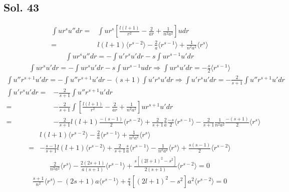 \subsection*{Sol. 43}
\begin{align*}
    \int ur^s u''dr = &
    \int ur^s\left[\frac{l(l+1)}{r^2}-\frac{2}{ar}+\frac{1}{n^2a^2}\right]udr\\
    =&l(l+1)\langle r^{s-2}\rangle-
    \frac{2}{a}\langle r^{s-1}\rangle
    +\frac{1}{n^2a^2}\langle r^s\rangle
\end{align*}
\begin{align*}
    \int ur^s u''dr = -\int u'r^su' dr -s\int ur^{s-1}u'dr
\end{align*}
\begin{align*}
    \int ur^s u'dr = -\int u r^s u' dr -s \int u r^{s-1}u dr\Rightarrow \int u r^su'dr = -\frac{s}{2}\langle r^{s-1}\rangle
\end{align*}
\begin{align*}
    \int u''r^{s+1}u' dr = -\int u''r^{s+1}u'dr - (s+1)\int u'r^su'dr\Rightarrow 
    \int u'r^su'dr = -\frac{2}{s+1}\int u''r^{s+1}u'dr
\end{align*}
\begin{align*}
    \int u'r^su'dr =& -\frac{2}{s+1}\int u''r^{s+1}u'dr\\
    =& -\frac{2}{s+1}\int
    \left[\frac{l(l+1)}{r^2}-\frac{2}{ar}+\frac{1}{n^2a^2}\right]u
    r^{s+1} u' dr\\
    =&-\frac{2}{s+1}l(l+1)\frac{-(s-1)}{2}\langle r^{s-2}\rangle
    +\frac{2}{s+1}\frac{2}{a}\frac{-s}{2}\langle r^{s-1}\rangle
    -\frac{2}{s+1}\frac{1}{n^2a^2}\frac{-(s+1)}{2}\langle r^s\rangle
\end{align*}
\begin{align*}
    &l(l+1)\langle r^{s-2}\rangle-
    \frac{2}{a}\langle r^{s-1}\rangle
    +\frac{1}{n^2a^2}\langle r^s\rangle \\
    =& 
    -\frac{s-1}{s+1}l(l+1)\langle r^{s-2}\rangle
    +\frac{2}{s+1}\frac{s}{a}\langle r^{s-1}\rangle
    -\frac{1}{n^2a^2}\langle r^s\rangle
    +\frac{s(s-1)}{2}\langle r^{s-2}\rangle
\end{align*}
\begin{align*}
    \frac{2}{n^2a^2}\langle r^s\rangle - \frac{2(2s+1)}{a(s+1)}\langle r^{s-1}\rangle 
    +\frac{s[(2l+1)^2-s^2]}{2(s+1)}\langle r^{s-2}\rangle = 0
\end{align*}
\begin{align*}
    \frac{s+1}{n^2}\langle r^s\rangle - (2s+1)a\langle r^{s-1}\rangle 
    + \frac{s}{4}[(2l+1)^2-s^2]a^2\langle r^{s-2}\rangle = 0
\end{align*}

